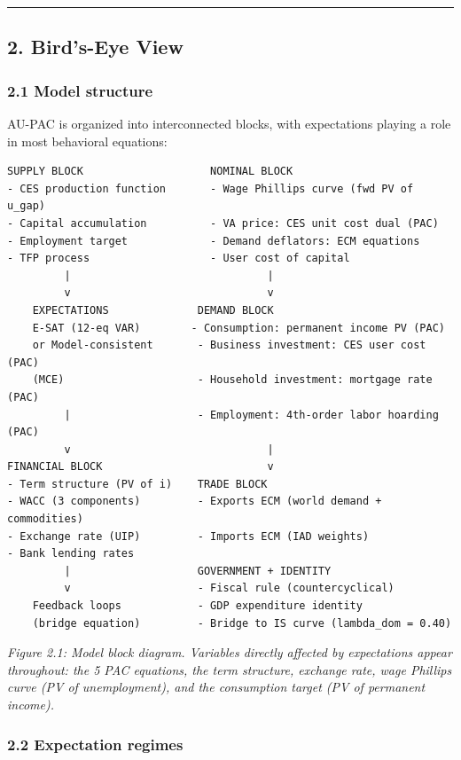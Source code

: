 \documentclass[
]{article}
\begin{document}
\begin{center}\rule{0.5\linewidth}{0.5pt}\end{center}

\subsection{2. Bird's-Eye View}\label{birds-eye-view}

\subsubsection{2.1 Model structure}\label{model-structure}

AU-PAC is organized into interconnected blocks, with expectations
playing a role in most behavioral equations:

\begin{verbatim}
SUPPLY BLOCK                    NOMINAL BLOCK
- CES production function       - Wage Phillips curve (fwd PV of u_gap)
- Capital accumulation          - VA price: CES unit cost dual (PAC)
- Employment target             - Demand deflators: ECM equations
- TFP process                   - User cost of capital
         |                               |
         v                               v
    EXPECTATIONS              DEMAND BLOCK
    E-SAT (12-eq VAR)        - Consumption: permanent income PV (PAC)
    or Model-consistent       - Business investment: CES user cost (PAC)
    (MCE)                     - Household investment: mortgage rate (PAC)
         |                    - Employment: 4th-order labor hoarding (PAC)
         v                               |
FINANCIAL BLOCK                          v
- Term structure (PV of i)    TRADE BLOCK
- WACC (3 components)         - Exports ECM (world demand + commodities)
- Exchange rate (UIP)         - Imports ECM (IAD weights)
- Bank lending rates
         |                    GOVERNMENT + IDENTITY
         v                    - Fiscal rule (countercyclical)
    Feedback loops            - GDP expenditure identity
    (bridge equation)         - Bridge to IS curve (lambda_dom = 0.40)
\end{verbatim}

\emph{Figure 2.1: Model block diagram. Variables directly affected by
expectations appear throughout: the 5 PAC equations, the term structure,
exchange rate, wage Phillips curve (PV of unemployment), and the
consumption target (PV of permanent income).}

\subsubsection{2.2 Expectation regimes}\label{expectation-regimes}
\end{document}
